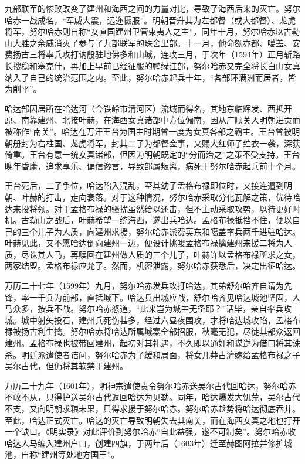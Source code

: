 九部联军的惨败改变了建州和海西之间的力量对比，导致了海西后来的灭亡。努尔哈赤一战成名，“军威大震，远迩慑服”。明朝晋升其为左都督（或大都督）、龙虎将军，努尔哈赤则自称“女直国建州卫管束夷人之主”。同年十月，努尔哈赤以古勒山大胜之余威消灭了参与了九部联军的珠舍里部。十一月，他命额亦都、噶盖、安费扬古三将率兵攻打讷殷驻地佛多和山城，连攻三月，于次年（1594年）正月斩路长搜稳和塞克什，再加上早前已经征服的鸭绿江部，努尔哈赤又完全将长白山女真纳入了自己的统治范围之内。至此，努尔哈赤起兵十年，“各部环满洲而居者，皆为削平”。

哈达部因居所在哈达河（今铁岭市清河区）流域而得名，其地东临辉发、西抵开原、南靠建州、北接叶赫，在海西女真诸部中方位偏南，因从广顺关入明朝进贡而被称作“南关”。哈达在万汗王台为国主时期曾一度为女真各部之霸主。王台曾被明朝册封为右柱国、龙虎将军，封其二子为都督佥事，又赐大红师子纻衣一袭，深获倚重。王台有意一统女真诸部，但因为明朝既定的“分而治之”之策不受支持。王台晚年昏庸，追求享乐、偏信谗言，导致部属叛离，病死于努尔哈赤起兵前十个月。

王台死后，二子争位，哈达陷入混乱，至其幼子孟格布禄即位时，又接连遭到明朝、叶赫的打击，走向衰落。对于这种情况，努尔哈赤采取分化瓦解之策，优待哈达来投将领。对于孟格布禄的骚扰虽然给以还击，但不主动采取攻势，以待更好时机。古勒山之战后，叶赫希望一统海西，遂出兵哈达。孟格布禄抵挡不住，便以自己的三个儿子为人质，向建州求援，努尔哈赤派费英东和噶盖率兵两千进驻哈达。叶赫见此，又不愿哈达倒向建州一边，便设计挑唆孟格布禄擒建州来援二将为人质，尽诛其人马，再赎回在建州做人质的三个儿子，叶赫许以孟格布禄所求之女，两家结盟。孟格布禄应允了。然而，机密泄露，努尔哈赤获悉后，决定出征哈达。

万历二十七年（1599年）九月，努尔哈赤发兵攻打哈达，其弟舒尔哈齐自请为先锋，率一千兵为前部，直抵城下。哈达兵出城应战，舒尔哈齐见哈达城池坚固，人马众多，按兵不战。努尔哈赤怒道，“此来岂为城中无备耶？”话毕，亲自率兵攻城。城中射矢投石，建州兵死伤甚多，经过六昼夜围攻，才将哈达城攻陷，孟格布禄被扬古利生擒。努尔哈赤将哈达所属城寨全部招服，秋毫无犯，尽徙其部众返回建州。孟格布禄也被带回建州，起初对其礼遇，不久即以通奸和谋逆为借口将其诛杀。明廷派遣使者诘问，努尔哈赤为了缓和局面，将女儿莽古濟嫁给孟格布禄之子吴尔古代，但仍将其软禁于建州。

万历二十九年（1601年），明神宗遣使责令努尔哈赤送吴尔古代回哈达，努尔哈赤不敢不从，只得护送吴尔古代返回哈达为贝勒。同年，哈达爆发大饥荒，吴尔古代不支，又向明朝求粮未果，只得求援于努尔哈赤。努尔哈赤趁势将哈达彻底吞并。至此，哈达正式灭亡。哈达的灭亡导致明朝失去其南关，而在海西女真之地也打开一个缺口。《明实录》对此评价到努尔哈赤“自此益强，遂不可制矣”。努尔哈赤收哈达人马编入建州户口，创建四旗，于两年后（1603年）迁至赫图阿拉并修扩城池，自称“建州等处地方国王”。

